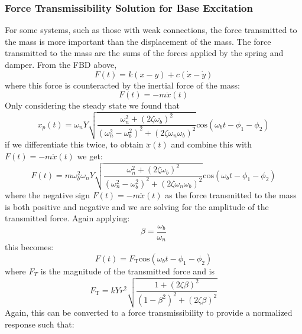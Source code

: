 \documentclass[12pt,letter]{article}
\numberwithin{ex}{section} %
\numberwithin{re}{section} %
\numberwithin{pr}{section} %
\begin{document}
			\subsubsection{Force Transmissibility Solution for Base Excitation}
			
				For some systems, such as those with weak connections, the force transmitted to the mass is more important than the displacement of the mass. The force transmitted to the mass are the sums of the forces applied by the spring and damper. From the FBD above,
				\begin{equation}
				F(t) = k(x-y) + c(\dot{x} - \dot{y}) 
				\end{equation}
				where this force is counteracted by the inertial force of the mass:
				\begin{equation}
				F(t) = -m\ddot{x}(t)
				\end{equation}
				Only considering the steady state we found that 
				\begin{equation}
					x_p(t) = 	\omega_n Y   \sqrt{\frac{\omega_n^2 + (2 \zeta \omega_b)^2 }{(\omega_n^2 - \omega_b^2)^2 +  (2\zeta \omega_n \omega_b)^2} }  \text{cos}(\omega_bt - \phi_1 - \phi_2)
				\end{equation} 
				if we differentiate this twice, to obtain $\ddot{x}(t)$ and combine this with $F(t) = -m\ddot{x}(t)$ we get:
				\begin{equation}
					F(t) = 	m \omega_b^2 \omega_n Y   \sqrt{\frac{\omega_n^2 + (2 \zeta \omega_b)^2 }{(\omega_n^2 - \omega_b^2)^2 +  (2\zeta \omega_n \omega_b)^2} }  \text{cos}(\omega_bt - \phi_1 - \phi_2)
				\end{equation} 
				where the negative sign $F(t) = -m\ddot{x}(t)$ as the force transmitted to the mass is both positive and negative and we are solving for the amplitude of the transmitted force. Again applying:
				\begin{equation}
					\beta=\frac{\omega_b}{\omega_n}
				\end{equation} 
				this becomes:
				\begin{equation}
					F(t) = 	F_\text{T} \text{cos}(\omega_bt - \phi_1 - \phi_2)
				\end{equation} 
				where $F_T$ is the magnitude of the transmitted force and is 
				\begin{equation}
					F_\text{T} = kYr^2 \sqrt{\frac{1+(2 \zeta \beta)^2}{(1-\beta^2)^2 + (2 \zeta \beta )^2}} 
				\end{equation}
				Again, this can be converted to a force transmissibility to provide a normalized response such that:
\end{document}
